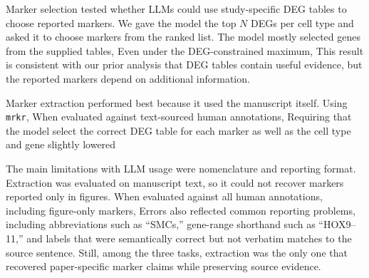 \documentclass[10pt,twocolumn]{article}
\theoremstyle{plain}
\theoremstyle{definition}
\theoremstyle{remark}
\begin{document}
Marker selection tested whether LLMs could use study-specific DEG tables to choose reported markers. We gave the model the top $N$ DEGs per cell type and asked it to choose markers from the ranked list. The model mostly selected genes from the supplied tables,  Even under the DEG-constrained maximum,  This result is consistent with our prior analysis that DEG tables contain useful evidence, but the reported markers depend on additional information.

Marker extraction performed best because it used the manuscript itself. Using \texttt{mrkr},  When evaluated against text-sourced human annotations,  Requiring that the model select the correct DEG table for each marker as well as the cell type and gene slightly lowered 

The main limitations with LLM usage were nomenclature and reporting format. Extraction was evaluated on manuscript text, so it could not recover markers reported only in figures. When evaluated against all human annotations, including figure-only markers,  Errors also reflected common reporting problems, including abbreviations such as ``SMCs,'' gene-range shorthand such as ``HOX9--11,'' and labels that were semantically correct but not verbatim matches to the source sentence. Still, among the three tasks, extraction was the only one that recovered paper-specific marker claims while preserving source evidence. 
\end{document}
